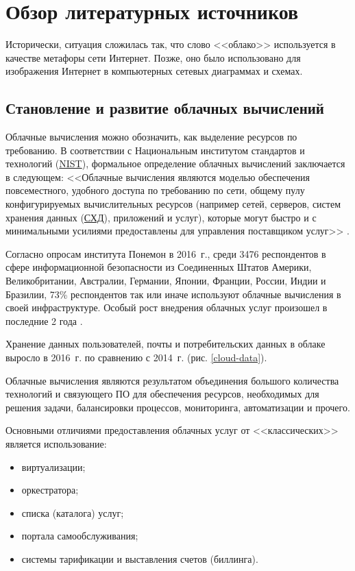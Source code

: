 \section{Обзор литературных источников}

Исторически, ситуация сложилась так, что слово <<облако>> используется в качестве метафоры сети Интернет.
Позже, оно было использовано для изображения Интернет в компьютерных сетевых диаграммах и схемах.

\subsection{Становление и развитие облачных вычислений}

Облачные вычисления можно обозначить, как выделение ресурсов по требованию.
В соответствии с Национальным институтом стандартов и технологий (\hyperlink{nist}{NIST}), формальное определение облачных вычислений заключается в следующем:
<<Облачные вычисления являются моделью обеспечения повсеместного, удобного доступа по требованию по сети, общему пулу конфигурируемых вычислительных ресурсов (например сетей, серверов, систем хранения данных (\hyperlink{storage}{СХД}), приложений и услуг), которые могут быстро и с минимальными усилиями предоставлены для управления поставщиком услуг>> \cite{nist}.

Согласно опросам института Понемон в 2016~г., среди 3476 респондентов в сфере информационной безопасности из Соединенных Штатов Америки, Великобритании, Австралии, Германии, Японии, Франции, России, Индии и Бразилии, 73\% респондентов так или иначе используют облачные вычисления в своей инфраструктуре.
Особый рост внедрения облачных услуг произошел в последние 2 года \cite{gemalto}.

Хранение данных пользователей, почты и потребительских данных в облаке выросло в 2016~г. по сравнению с 2014~г. (рис. \ref{cloud-data}).


Облачные вычисления являются результатом объединения большого количества технологий и связующего ПО для обеспечения ресурсов, необходимых для решения задачи, балансировки процессов, мониторинга, автоматизации и прочего.

Основными отличиями предоставления облачных услуг от <<классических>> является использование:
\begin{itemize}
  \item виртуализации;
  \item оркестратора;
  \item списка (каталога) услуг;
  \item портала самообслуживания;
  \item системы тарификации и выставления счетов (биллинга).
\end{itemize}

